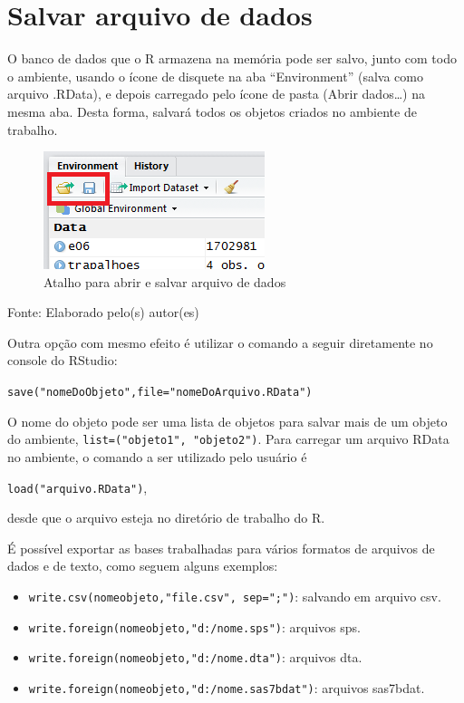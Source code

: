 \documentclass[12pt,brazil,oneside]{book}
\providecommand{\tightlist}{%
  \setlength{\itemsep}{0pt}\setlength{\parskip}{0pt}}
\begin{document}
\hypertarget{salvar-arquivo-de-dados}{%
\section{Salvar arquivo de dados}\label{salvar-arquivo-de-dados}}

O banco de dados que o R armazena na memória pode ser salvo, junto com todo o ambiente, usando o ícone de disquete na aba ``Environment'' (salva como arquivo .RData), e depois carregado pelo ícone de pasta (Abrir dados\ldots{}) na mesma aba. Desta forma, salvará todos os objetos criados no ambiente de trabalho.

\begin{figure}[H]

{\centering \includegraphics[width=0.8\linewidth]{r6} 

}

\caption{Atalho para abrir e salvar arquivo de dados}\label{fig:r6}
\end{figure}

Fonte: Elaborado pelo(s) autor(es)

Outra opção com mesmo efeito é utilizar o comando a seguir diretamente no console do RStudio:

\texttt{save("nomeDoObjeto",file="nomeDoArquivo.RData")}

O nome do objeto pode ser uma lista de objetos para salvar mais de um objeto do ambiente, \texttt{list=("objeto1",\ "objeto2")}. Para carregar um arquivo RData no ambiente, o comando a ser utilizado pelo usuário é

\texttt{load("arquivo.RData")},

desde que o arquivo esteja no diretório de trabalho do R.

É possível exportar as bases trabalhadas para vários formatos de arquivos de dados e de texto, como seguem alguns exemplos:

\begin{itemize}
\tightlist
\item
  \texttt{write.csv(nomeobjeto,"file.csv",\ sep=";")}: salvando em arquivo csv.
\item
  \texttt{write.foreign(nomeobjeto,"d:/nome.sps")}: arquivos sps.
\item
  \texttt{write.foreign(nomeobjeto,"d:/nome.dta")}: arquivos dta.
\item
  \texttt{write.foreign(nomeobjeto,"d:/nome.sas7bdat")}: arquivos sas7bdat.
\end{itemize}
\end{document}
